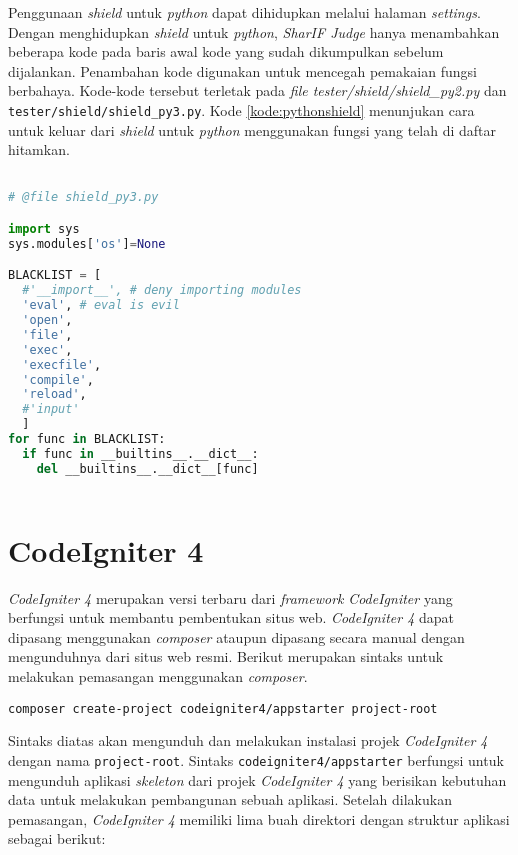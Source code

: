 Penggunaan \textit{shield} untuk \textit{python} dapat dihidupkan melalui halaman \textit{settings}. Dengan menghidupkan \textit{shield} untuk \textit{python}, \textit{SharIF Judge} hanya menambahkan beberapa kode pada baris awal kode yang sudah dikumpulkan sebelum dijalankan. Penambahan kode digunakan untuk mencegah pemakaian fungsi berbahaya. Kode-kode tersebut terletak pada \textit{file tester/shield/shield\_py2.py} dan \texttt{tester/shield/shield\_py3.py}. Kode \ref{kode:pythonshield} menunjukan cara untuk keluar dari \textit{shield} untuk \textit{python} menggunakan fungsi yang telah di daftar hitamkan.

\begin{lstlisting}[language=Python,caption=Cara keluar dari \textit{shield} untuk \textit{python},label=kode:pythonshield]

# @file shield_py3.py

import sys
sys.modules['os']=None

BLACKLIST = [
  #'__import__', # deny importing modules
  'eval', # eval is evil
  'open',
  'file',
  'exec',
  'execfile',
  'compile',
  'reload',
  #'input'
  ]
for func in BLACKLIST:
  if func in __builtins__.__dict__:
    del __builtins__.__dict__[func]
    
\end{lstlisting}

\section{CodeIgniter 4\cite{codeigniter:23:ci4}}
\label{sec:ci4}

\textit{CodeIgniter 4} merupakan versi terbaru dari \textit{framework} \textit{CodeIgniter} yang berfungsi untuk membantu pembentukan situs web. \textit{CodeIgniter 4} dapat dipasang menggunakan \textit{composer} ataupun dipasang secara manual dengan mengunduhnya dari situs web resmi. Berikut merupakan sintaks untuk melakukan pemasangan menggunakan \textit{composer}.

\begin{center}
\verb|composer create-project codeigniter4/appstarter project-root|
\end{center}

Sintaks diatas akan mengunduh dan melakukan instalasi projek \textit{CodeIgniter 4} dengan nama \texttt{project-root}. Sintaks \texttt{codeigniter4/appstarter} berfungsi untuk mengunduh aplikasi \textit{skeleton} dari projek \textit{CodeIgniter 4} yang berisikan kebutuhan data untuk melakukan pembangunan sebuah aplikasi. Setelah dilakukan pemasangan, \textit{CodeIgniter 4} memiliki lima buah direktori dengan struktur aplikasi sebagai berikut:

